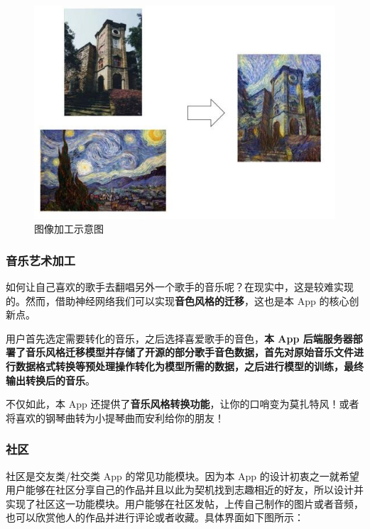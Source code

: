 \begin{figure}[H]
    \centering
    \includegraphics[width=0.8
    \textwidth]{figures/img-trans.jpg}
    \caption{图像加工示意图}
    \label{fig:my_label}
\end{figure}

\subsubsection{音乐艺术加工}

如何让自己喜欢的歌手去翻唱另外一个歌手的音乐呢？在现实中，这是较难实现的。然而，借助神经网络我们可以实现\textbf{音色风格的迁移}，这也是本 App 的核心创新点。

用户首先选定需要转化的音乐，之后选择喜爱歌手的音色，\textbf{本 App 后端服务器部署了音乐风格迁移模型并存储了开源的部分歌手音色数据，首先对原始音乐文件进行数据格式转换等预处理操作转化为模型所需的数据，之后进行模型的训练，最终输出转换后的音乐}。

不仅如此，本 App 还提供了\textbf{音乐风格转换功能}，让你的口哨变为莫扎特风！或者将喜欢的钢琴曲转为小提琴曲而安利给你的朋友！

\subsubsection{社区}

社区是交友类/社交类 App 的常见功能模块。因为本 App 的设计初衷之一就希望用户能够在社区分享自己的作品并且以此为契机找到志趣相近的好友，所以设计并实现了社区这一功能模块。用户能够在社区发帖，上传自己制作的图片或者音频，也可以欣赏他人的作品并进行评论或者收藏。具体界面如下图所示：

